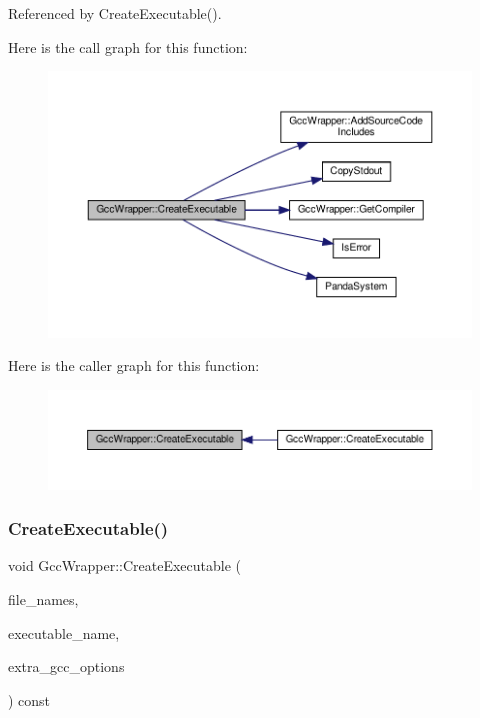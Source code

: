Referenced by Create\+Executable().

Here is the call graph for this function\+:
\nopagebreak
\begin{figure}[H]
\begin{center}
\leavevmode
\includegraphics[width=350pt]{d4/dbf/classGccWrapper_ac2cc3fad0dd5560c7dc07e56bf19ec02_cgraph}
\end{center}
\end{figure}
Here is the caller graph for this function\+:
\nopagebreak
\begin{figure}[H]
\begin{center}
\leavevmode
\includegraphics[width=350pt]{d4/dbf/classGccWrapper_ac2cc3fad0dd5560c7dc07e56bf19ec02_icgraph}
\end{center}
\end{figure}
\mbox{\label{classGccWrapper_a22e1843178f153216c1f7775e00938d7}} 
\subsubsection{\texorpdfstring{Create\+Executable()}{CreateExecutable()}\hspace{0.1cm}{\footnotesize\ttfamily [2/2]}}
{\footnotesize\ttfamily void Gcc\+Wrapper\+::\+Create\+Executable (\begin{DoxyParamCaption}\item[{const \hyperlink{custom__set_8hpp_a615bc2f42fc38a4bb1790d12c759e86f}{Custom\+Set}$<$ std\+::string $>$ \&}]{file\+\_\+names,  }\item[{const std\+::string \&}]{executable\+\_\+name,  }\item[{const std\+::string \&}]{extra\+\_\+gcc\+\_\+options }\end{DoxyParamCaption}) const}



